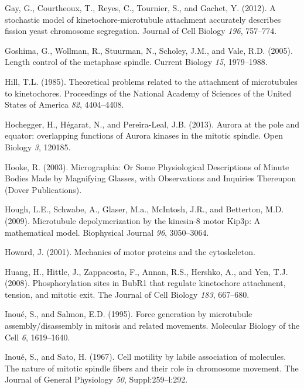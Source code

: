 \documentclass[12pt,a4paper,twoside,openright]{book}
\begin{document}
Gay, G., Courtheoux, T., Reyes, C., Tournier, S., and Gachet, Y. (2012).
A stochastic model of kinetochore-microtubule attachment accurately
describes fission yeast chromosome segregation. Journal of Cell Biology
\emph{196}, 757--774.

Goshima, G., Wollman, R., Stuurman, N., Scholey, J.M., and Vale, R.D.
(2005). Length control of the metaphase spindle. Current Biology
\emph{15}, 1979--1988.

Hill, T.L. (1985). Theoretical problems related to the attachment of
microtubules to kinetochores. Proceedings of the National Academy of
Sciences of the United States of America \emph{82}, 4404--4408.

Hochegger, H., Hégarat, N., and Pereira-Leal, J.B. (2013). Aurora at the
pole and equator: overlapping functions of Aurora kinases in the mitotic
spindle. Open Biology \emph{3}, 120185.

Hooke, R. (2003). Micrographia: Or Some Physiological Descriptions of
Minute Bodies Made by Magnifying Glasses, with Observations and
Inquiries Thereupon (Dover Publications).

Hough, L.E., Schwabe, A., Glaser, M.a., McIntosh, J.R., and Betterton,
M.D. (2009). Microtubule depolymerization by the kinesin-8 motor Kip3p:
A mathematical model. Biophysical Journal \emph{96}, 3050--3064.

Howard, J. (2001). Mechanics of motor proteins and the cytoskeleton.

Huang, H., Hittle, J., Zappacosta, F., Annan, R.S., Hershko, A., and
Yen, T.J. (2008). Phosphorylation sites in BubR1 that regulate
kinetochore attachment, tension, and mitotic exit. The Journal of Cell
Biology \emph{183}, 667--680.

Inoué, S., and Salmon, E.D. (1995). Force generation by microtubule
assembly/disassembly in mitosis and related movements. Molecular Biology
of the Cell \emph{6}, 1619--1640.

Inoué, S., and Sato, H. (1967). Cell motility by labile association of
molecules. The nature of mitotic spindle fibers and their role in
chromosome movement. The Journal of General Physiology \emph{50},
Suppl:259--l:292.
\end{document}
